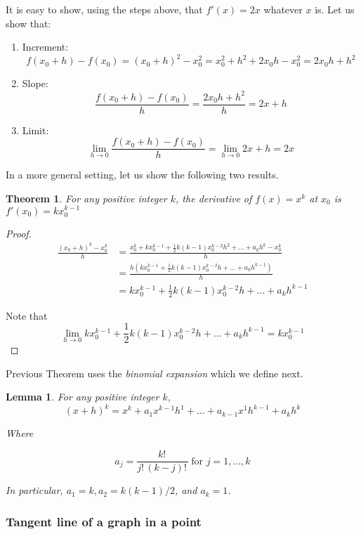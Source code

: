\documentclass[11pt]{article}
\providecommand{\tightlist}{%
      \setlength{\itemsep}{0pt}\setlength{\parskip}{0pt}}
\theoremstyle{definition}
\theoremstyle{plain}
\newtheorem{theorem}{Theorem}
\newtheorem{lemma}{Lemma}
\begin{document}
It is easy to show, using the steps above, that \(f'(x) = 2x\) whatever
\(x\) is. Let us show that:

\begin{enumerate}
\def\labelenumi{\arabic{enumi}.}
\tightlist
\item
  Increment: \[
  f(x_0 + h)-f(x_0) = (x_0+h)^2-x_0^2 = x_0^2+h^2+2x_0h-x_0^2 = 2x_0 h +h^2
  \]
\item
  Slope: \[
  \frac{f(x_0+h)-f(x_0)}{h} = \frac{2x_0 h +h^2}{h} = 2x + h
  \]
\item
  Limit: \[
  \lim_{h\rightarrow 0}{\frac{f(x_0+h)-f(x_0)}{h}} = \lim_{h\rightarrow 0}{2x+h} = 2x
  \]
\end{enumerate}

In a more general setting, let us show the following two results.

\begin{theorem}
For any positive integer \(k\), the derivative of
\(f(x) = x^k\) at \(x_0\) is \(f'(x_0) = k x_0^{k-1}\)
\end{theorem}

\begin{proof}
\begin{align*}
\frac{(x_0+h)^k-x_0^k}{h} &= \frac{x_0^k+kx_0^{k-1} + \frac{1}{2}k(k-1)x_0^{k-2}h^2+\ldots+a_kh^k-x_0^k}{h} \\
&= \frac{h(kx_0^{k-1} + \frac{1}{2}k(k-1)x_0^{k-2}h + \ldots + a_k h^{k-1})}{h} \\
&= kx_0^{k-1}  + \frac{1}{2}k(k-1)x_0^{k-2}h + \ldots + a_k h^{k-1}
\end{align*}

Note that \[
\lim_{h\rightarrow 0}{kx_0^{k-1}  + \frac{1}{2}k(k-1)x_0^{k-2}h + \ldots + a_k h^{k-1}} = kx_0^{k-1}
\]
\end{proof}

Previous Theorem uses the \emph{binomial expansion} which we define
next.

\begin{lemma}
For any positive integer \(k\), \[
(x + h)^k = x^k + a_1 x^{k-1}h^1+\ldots+a_{k-1}x^1 h^{k-1} + a_k h^k
\]

Where

\[
a_j = \frac{k!\,}{j!\,(k-j)!\,} \ \text{for } j = 1, \ldots, k
\]

In particular, \(a_1 = k, a_2 = k(k-1) / 2\), and \(a_k = 1\).
\end{lemma}

\subsubsection{Tangent line of a graph in a
point}\label{tangent-line-of-a-graph-in-a-point}
\end{document}
